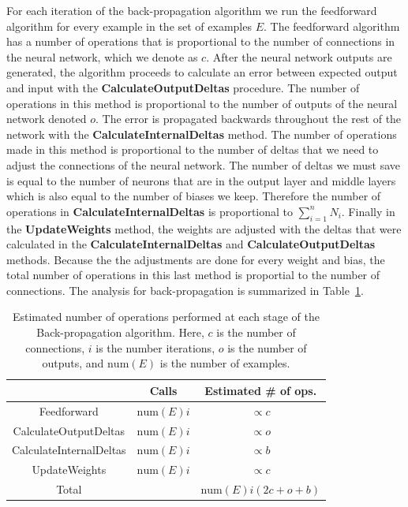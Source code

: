 \documentclass[11pt]{article}
\begin{document}
For each iteration of the back-propagation algorithm we run the feedforward algorithm for every example in the set of examples $E$. The
feedforward algorithm has a number of operations that is proportional to the number of connections in the neural network, which we
denote as $c$. After the neural network outputs are generated, the algorithm proceeds to calculate an error between expected output and
input with the \textbf{CalculateOutputDeltas} procedure. The number of operations in this method is proportional to the number of
outputs of the neural network denoted $o$. The error is propagated backwards throughout the rest of the network with the
\textbf{CalculateInternalDeltas} method. The number of operations made in this method is proportional to the number of deltas that we
need to adjust the connections of the neural network. The number of deltas we must save is equal to the number of neurons that are in
the output layer and middle layers which is also equal to the number of biases we keep. Therefore the number of operations in
\textbf{CalculateInternalDeltas} is proportional to $\sum_{i=1}^{n}N_{i}$. Finally in the \textbf{UpdateWeights} method, the weights are
adjusted with the deltas that were calculated in the \textbf{CalculateInternalDeltas} and \textbf{CalculateOutputDeltas} methods.
Because the the adjustments are done for every weight and bias, the total number of operations in this last method is proportial to the
number of connections. The analysis for back-propagation is summarized in Table~\ref{tab:backpropagation}.

\begin{table}
	\label{tab:backpropagation}
	\begin{center}
		\begin{tabular}{ccc}
		\hline
		& Calls & Estimated \# of ops.\\
		\hline
		Feedforward & $\mbox{num}(E)i$ & $\propto c$\\
		CalculateOutputDeltas & $\mbox{num}(E)i$ & $\propto o$\\
		CalculateInternalDeltas & $\mbox{num}(E)i$ & $\propto b$\\
		UpdateWeights & $\mbox{num}(E)i$ & $\propto c$\\
		\hline
		Total & & $\mbox{num}(E)i(2c+o+b)$\\
		\hline
		\end{tabular}
		\caption{Estimated number of operations performed at each stage of the Back-propagation algorithm. Here, $c$ is the number of connections, $i$ is the number iterations, $o$ is the number of outputs, and $\mbox{num}(E)$ is the number of examples.}
	\end{center}
\end{table}
\end{document}
